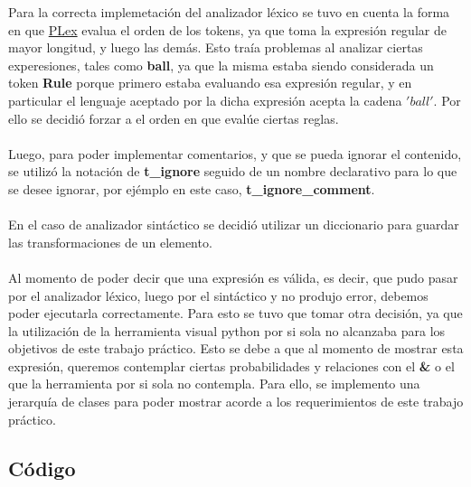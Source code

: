 Para la correcta implemetaci\'on del analizador l\'exico se tuvo en cuenta la forma en que \href{http://www.dabeaz.com/ply/ply.html#ply_nn3}{PLex} evalua el orden de los tokens, ya que toma la expresi\'on regular de mayor longitud, y luego las dem\'as. Esto tra\'ia problemas al analizar ciertas experesiones, tales como \textbf{ball}, ya que la misma estaba siendo considerada un token \textbf{Rule} porque primero estaba evaluando esa expresi\'on regular, y en particular el lenguaje aceptado por la dicha expresi\'on acepta la cadena $'ball'$. Por ello se decidi\'o forzar a el orden en que eval\'ue ciertas reglas.
\\
\\
Luego, para poder implementar comentarios, y que se pueda ignorar el contenido, se utiliz\'o la notaci\'on de \textbf{t\_ignore} seguido de un nombre declarativo para lo que se desee ignorar, por ej\'emplo en este caso, \textbf{t\_ignore\_comment}.
\\
\\
En el caso de analizador sint\'actico se decidi\'o utilizar un diccionario para guardar las transformaciones de un elemento.
\\
\\
Al momento de poder decir que una expresi\'on es v\'alida, es decir, que pudo pasar por el analizador l\'exico, luego por el sint\'actico y no produjo error, debemos poder ejecutarla correctamente. Para esto se tuvo que tomar otra decisi\'on, ya que la utilizaci\'on de la herramienta visual python por si sola no alcanzaba para los objetivos de este trabajo pr\'actico. Esto se debe a que al momento de mostrar esta expresi\'on, queremos contemplar ciertas probabilidades y relaciones con el \textbf{ \& } o el \textbf{ \textbar } que la herramienta por si sola no contempla. 
Para ello, se implemento una jerarqu\'ia de clases para poder mostrar acorde a los requerimientos de este trabajo pr\'actico.


\subsection{C\'odigo}

